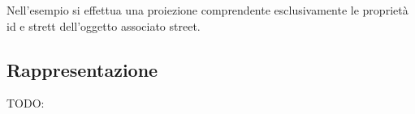 Nell'esempio si effettua una proiezione comprendente esclusivamente le proprietà id e strett dell'oggetto associato street.

\subsection{Rappresentazione}
TODO:






















